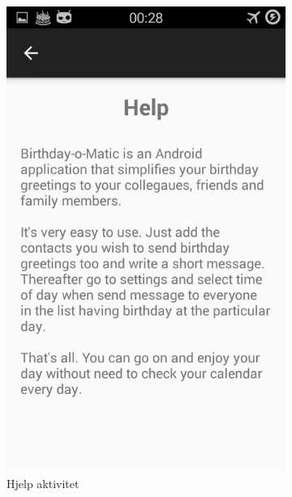 \begin{figure}[ht]
\begin{subfigure}[b]{0.35\textwidth}
        \includegraphics[width=\textwidth]{./img/9.png}
        \caption{Hjelp aktivitet}
        \label{fig:hjelp_aktivitet}
    \end{subfigure}
    \begin{subfigure}[b]{0.35\textwidth}

\end{subfigure}
\end{figure}

